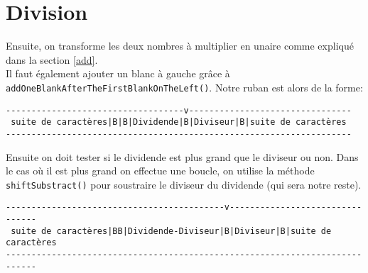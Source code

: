 \documentclass[a4paper,11pt]{article}
\begin{document}
\section{Division}
Ensuite, on transforme les deux nombres à multiplier en unaire comme expliqué dans la section \ref{add}.\\Il faut également ajouter un blanc à gauche grâce à \texttt{addOneBlankAfterTheFirstBlank\-On\-The\-Left()}.
Notre ruban est alors de la forme:
\begin{verbatim}
-----------------------------------v--------------------------------
 suite de caractères|B|B|Dividende|B|Diviseur|B|suite de caractères
--------------------------------------------------------------------
\end{verbatim}
Ensuite on doit tester si le dividende est plus grand que le diviseur ou non. 
Dans le cas où il est plus grand on effectue une boucle, on utilise la méthode \texttt{shiftSubstract()} pour soustraire le diviseur du dividende (qui sera notre reste).
\begin{small}
\begin{verbatim}
-------------------------------------------v--------------------------------
 suite de caractères|BB|Dividende-Diviseur|B|Diviseur|B|suite de caractères
----------------------------------------------------------------------------
\end{verbatim}
\end{small}
\end{document}
